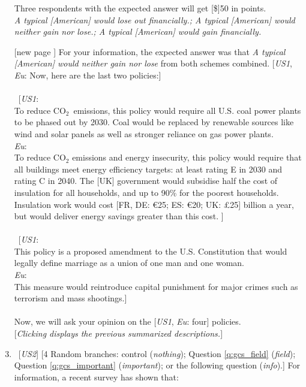 \begin{enumerate}[resume]
Three respondents with the expected answer will get [\$]50 in points.
\\ \textit{A typical [American] would lose out financially.; A typical [American] would neither gain nor lose.; A typical [American] would gain financially.}
\item[[new page\!\!\!]] For your information, the expected answer was that \textit{A typical [American] would neither gain nor lose} from both schemes combined. [\textit{US1}, \textit{Eu}: Now, here are the last two policies:]~ \\
\\
~[\textit{US1}: \textbf{} \\To reduce CO$_\text{2}$~emissions, this policy would require all U.S. coal power plants to be phased out by 2030. Coal would be replaced by renewable sources like wind and solar panels as well as stronger reliance on gas power plants.\\
\textit{Eu}: \textbf{}\\ To reduce CO$_\text{2}$ emissions and energy insecurity, this policy would require that all buildings meet energy efficiency targets: at least rating E in 2030 and rating C in 2040. 
The [UK] government would subsidise half the cost of insulation for all households, and up to 90\% for the poorest households. Insulation work would cost [FR, DE: \euro{}25; ES: \euro{}20; UK: £25] billion a year, but would deliver energy savings greater than this cost.
]~\\
\\
~[\textit{US1}: \textbf{}\\
This policy is a proposed amendment to the U.S. Constitution that would legally define marriage as a union of one man and one woman. \\
\textit{Eu}: \textbf{} \\This measure would reintroduce capital punishment for major crimes such as terrorism and mass shootings.]~\\
\\
Now, we will ask your opinion on the [\textit{US1}, \textit{Eu}: four] policies.\\
 [\textit{Clicking displays the previous summarized descriptions.}]
\item ~[\textit{US2}] [4 Random branches: control (\textit{nothing}); Question \ref{q:gcs_field} (\textit{field}); Question \ref{q:gcs_important} (\textit{important}); or the following question (\textit{info}).] \label{q:info_support} For information, a recent survey has shown that:

\end{enumerate}
